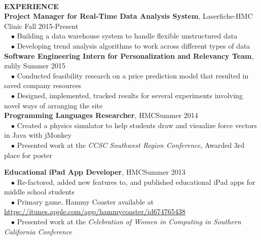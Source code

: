 \documentclass[11.5pt]{article}
\newcommand{\wrapTitle}[1]{{\sectionNL \textbf{\Large #1}} \sectionNL}
\newcommand{\sectionNL}{~\\[1pt]}
\newcommand{\customtab}{$\hspace{10pt} \bullet \hspace{2pt}$}
\newcommand{\HMC}{HMC}
\newcommand{\rightAlign}{\hfill}
\begin{document}
\begin{flushleft}
\wrapTitle{EXPERIENCE}
\textbf{Project Manager for Real-Time Data Analysis System}, Laserfiche-HMC Clinic \rightAlign Fall 2015-Present \\ 
\customtab Building a data warehouse system to handle flexible unstructured data \\
\customtab Developing trend analysis algorithms to work across different types of data \\
\textbf{Software Engineering Intern for Personalization and Relevancy Team}, zulily \rightAlign Summer 2015 \\
\customtab Conducted feasibility research on a price prediction model that resulted in saved company resources \\
\customtab Designed, implemented, tracked results for several experiments involving novel ways of arranging the site \\

\textbf{Programming Languages Researcher}, \HMC \rightAlign Summer 2014 \\
\customtab Created a physics simulator to help students draw and visualize force vectors in Java with jMonkey\\
\customtab Presented work at the \textit{CCSC Southwest Region Conference}, Awarded 3rd place for poster 

\textbf{Educational iPad App Developer}, \HMC \rightAlign Summer 2013 \\
\customtab Re-factored, added new features to, and published educational iPad apps for middle school students \\
\customtab Primary game, Hammy Coaster available at \url{https://itunes.apple.com/app/hammycoaster/id674765438} \\
\customtab Presented work at the \textit{Celebration of Women in Computing in Southern California Conference }
\end{flushleft}


\end{document}
